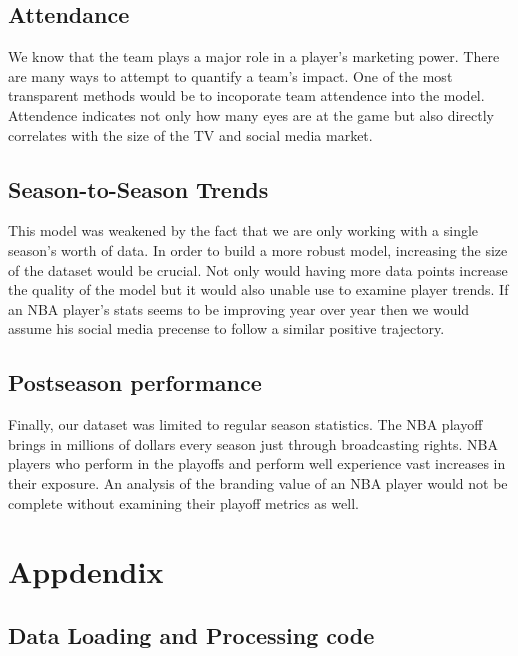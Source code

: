 \documentclass[11pt]{article}
\begin{document}
\subsection{Attendance}\label{attendance}

We know that the team plays a major role in a player's marketing power.
There are many ways to attempt to quantify a team's impact. One of the
most transparent methods would be to incoporate team attendence into the
model. Attendence indicates not only how many eyes are at the game but
also directly correlates with the size of the TV and social media
market.

\subsection{Season-to-Season Trends}\label{season-to-season-trends}

This model was weakened by the fact that we are only working with a
single season's worth of data. In order to build a more robust model,
increasing the size of the dataset would be crucial. Not only would
having more data points increase the quality of the model but it would
also unable use to examine player trends. If an NBA player's stats seems
to be improving year over year then we would assume his social media
precense to follow a similar positive trajectory.

\subsection{Postseason performance}\label{postseason-performance}

Finally, our dataset was limited to regular season statistics. The NBA
playoff brings in millions of dollars every season just through
broadcasting rights. NBA players who perform in the playoffs and perform
well experience vast increases in their exposure. An analysis of the
branding value of an NBA player would not be complete without examining
their playoff metrics as well.

\pagebreak

\section{Appdendix}

\subsection{Data Loading and Processing code}
\end{document}
